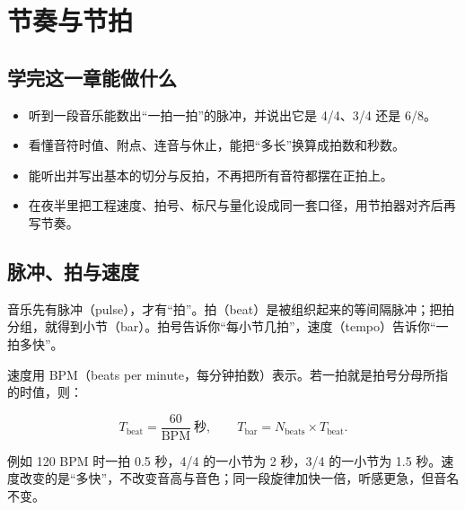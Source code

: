 \chapter{节奏与节拍}


\label{sec:rhythm-and-meter}

\section*{学完这一章能做什么}
\begin{itemize}
  \item 听到一段音乐能数出“一拍一拍”的脉冲，并说出它是 4/4、3/4 还是 6/8。
  \item 看懂音符时值、附点、连音与休止，能把“多长”换算成拍数和秒数。
  \item 能听出并写出基本的切分与反拍，不再把所有音符都摆在正拍上。
  \item 在夜半里把工程速度、拍号、标尺与量化设成同一套口径，用节拍器对齐后再写节奏。
\end{itemize}

\section{脉冲、拍与速度}

音乐先有脉冲（pulse），才有“拍”。拍（beat）是被组织起来的等间隔脉冲；把拍分组，就得到小节（bar）。拍号告诉你“每小节几拍”，速度（tempo）告诉你“一拍多快”。

速度用 BPM（beats per minute，每分钟拍数）表示。若一拍就是拍号分母所指的时值，则：

\begin{equation}
  T_{\text{beat}} = \frac{60}{\mathrm{BPM}}\ \text{秒},
  \qquad
  T_{\text{bar}} = N_{\text{beats}} \times T_{\text{beat}}.
  \label{eq:beat-duration}
\end{equation}

例如 120 BPM 时一拍 0.5 秒，4/4 的一小节为 2 秒，3/4 的一小节为 1.5 秒。速度改变的是“多快”，不改变音高与音色；同一段旋律加快一倍，听感更急，但音名不变。

